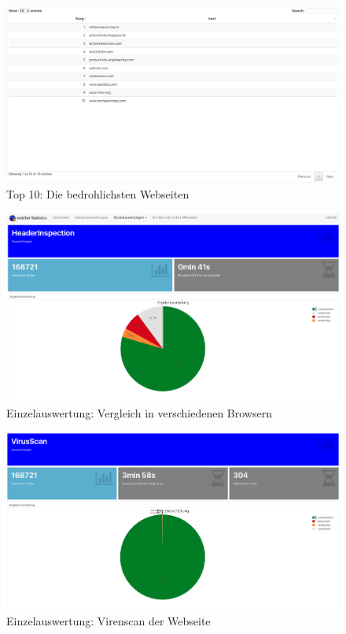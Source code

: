 \begin{landscape}
\begin{figure}[H]
  \centering
  \includegraphics[width=\textheight]{images/stats/top10}
  \caption{Top 10: Die bedrohlichsten Webseiten}
\end{figure}

\begin{figure}[H]
  \centering
  \includegraphics[width=\textheight]{images/stats/headerinspection}
  \caption{Einzelauswertung: Vergleich in verschiedenen Browsern}
\end{figure}

\begin{figure}[H]
  \centering
  \includegraphics[width=\textheight]{images/stats/virusscan}
  \caption{Einzelauswertung: Virenscan der Webseite}
\end{figure}


\end{landscape}
